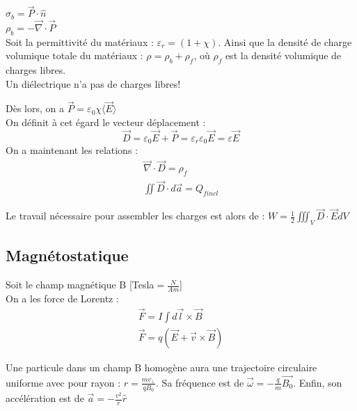 \documentclass[../main.tex]{subfiles}
\begin{document}
$\sigma_b= \vec{P}\cdot \hat{n}$\\
$\rho_b = -\vec{\nabla} \cdot \vec{P}$\\

Soit la permittivité du matériaux : $\varepsilon_r = (1+\chi)$. Ainsi que la densité de charge volumique totale du matériaux : $\rho = \rho_b + \rho_f$, où $\rho_f$ est la densité volumique de charges libres.\\
\warning Un diélectrique n'a pas de charges libres!

Dès lors, on a $\vec{P} = \varepsilon_0 \chi \langle \vec{E}\rangle$\\

On définit à cet égard le vecteur déplacement : \\
\begin{equation}
    \vec{D} = \varepsilon_0 \vec{E} + \vec{P} = \varepsilon_r \varepsilon_0 \vec{E} = \varepsilon \vec{E}
\end{equation}
On a maintenant les relations :\\
\begin{equation}
    \begin{split}
        \vec{\nabla} \cdot \vec{D} = \rho_f\\
        \iint \vec{D} \cdot d\vec{a} = Q_{fincl}
    \end{split}
\end{equation}

Le travail nécessaire pour assembler les charges est alors de : $W = \frac{1}{2} \iiint_V \vec{D} \cdot \vec{E} dV$\\


\subsection{Magnétostatique}
Soit le champ magnétique B [Tesla$=\frac{N}{Am}$]\\
On a les force de Lorentz :\\
\begin{equation}
\begin{split}
        \vec{F} = I\int d\vec{l} \times \vec{B}\\
        \vec{F} = q(\vec{E} + \vec{v}\times \vec{B})
\end{split}
\end{equation}

Une particule dans un champ B homogène aura une trajectoire circulaire uniforme avec pour rayon : $r = \frac{mv_{\perp}}{qB_0}$. Sa fréquence est de $\vec{\omega} = -\frac{q}{m}\vec{B_0}$. Enfin, son accélération est de $\vec{a} = -\frac{v^2}{r} \hat{r}$\\
\end{document}
